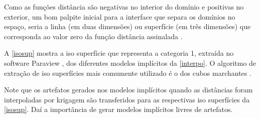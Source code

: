 Como as funções distância são negativas no interior do domínio e positivas no exterior, um bom palpite inicial para a interface que separa os domínios no espaço, seria a linha (em duas dimensões) ou superfície (em três dimensões) que corresponda ao valor zero da função distância assinalada \cite{wildedeutschcalibrate}. 

A \autoref{isosup} mostra a iso superfície que representa a categoria 1, extraída no software Paraview \cite{ahrens2005paraview}, dos diferentes modelos implícitos da \autoref{interpo}. O algoritmo de extração de iso superfícies mais comumente utilizado é o dos cubos marchantes \cite{lorensen1987marching}. 

Note que os artefatos gerados nos modelos implícitos quando as distâncias foram interpoladas por krigagem são transferidos para as respectivas iso superfícies da \autoref{isosup}. Daí a importância de gerar modelos implícitos livres de artefatos.


